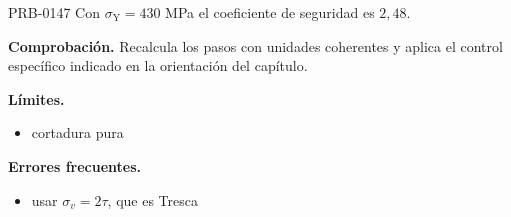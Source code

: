 \begin{studiumworked}{PRB-0147}
Con $\sigma_{\mathrm{Y}} = 430$ MPa el coeficiente de seguridad es $2{,}48$.

\par\textbf{Comprobación.} Recalcula los pasos con unidades coherentes y aplica el control específico indicado en la orientación del capítulo.

\textbf{Límites.}\begin{itemize}\item cortadura pura\end{itemize}

\textbf{Errores frecuentes.}\begin{itemize}\item usar $\sigma_v = 2\tau$, que es Tresca\end{itemize}

\end{studiumworked}

\Needspace{.3\textheight}


